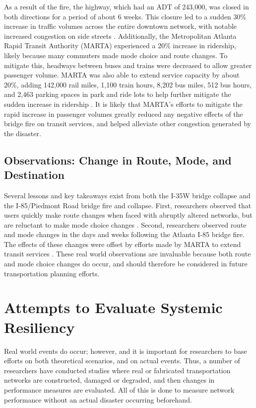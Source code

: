As a result of the fire, the highway, which had an ADT of 243,000,
was closed in both directions for a period of about 6 weeks. This
closure led to a sudden 30\%
increase in traffic volumes across the entire downtown network, with
notable increased congestion on side
streets \citep{hamedi2018}. Additionally, the Metropolitan Atlanta Rapid
Transit Authority
(MARTA) experienced a 20\% increase in ridership, likely because many
commuters made mode choice
and route changes. To mitigate this, headways between buses and trains
were decreased to allow
greater passenger volume. MARTA was also able to extend service capacity by about 20\%, adding 142,000 rail miles, 1,100
train hours, 8,202 bus
miles, 512 bus hours, and 2,463 parking spaces in park and ride lots to
help further mitigate the sudden increase in ridership \citep{marta2017, marta2018}. It is likely that MARTA’s efforts
to mitigate the rapid increase in passenger
volumes greatly reduced any negative effects of the bridge
fire on transit services, and helped alleviate other congestion generated by the disaster.

\subsection{Observations: Change in Route, Mode, and Destination}
Several lessons and key takeaways exist from both the I-35W bridge collapse and the
I-85/Piedmont Road bridge fire and collapse. First, researchers observed that users
quickly make route changes when faced with abruptly altered networks, but are reluctant
to make mode choice changes \citep{levinson2010}. Second, researchers observed
route and mode changes in the days and weeks following the Atlanta I-85 bridge fire.
The effects of these changes were offset by efforts made by MARTA to extend transit
services \citep{hamedi2018, marta2017, marta2018}. These real world observations
are invaluable because both route and mode choice changes do occur, and should therefore
be considered in future transportation planning efforts.

\section{Attempts to Evaluate Systemic Resiliency}

Real world events do occur; however, and it is important for researchers to
base efforts on both theoretical scenarios, and on actual events.
Thus, a number of researchers have conducted studies where real
or fabricated transportation networks are constructed, damaged or degraded, and
then changes in performance measures are evaluated. All of this is done to measure
network performance without
an actual disaster occurring beforehand.

